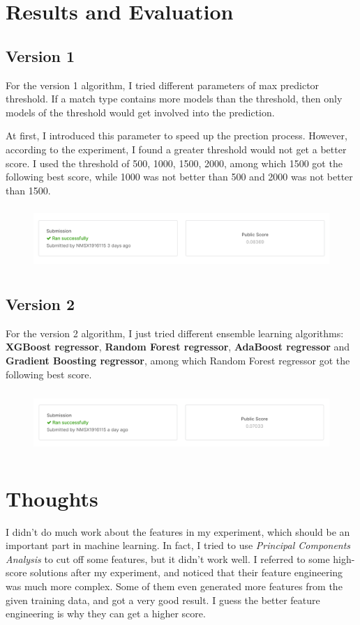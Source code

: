 \documentclass[journal=jacsat,manuscript=article]{achemso}
\begin{document}
\section{Results and Evaluation}

\subsection{Version 1}

For the version 1 algorithm, I tried different parameters of max predictor threshold.
If a match type contains more models than the threshold, then only models of the
threshold would get involved into the prediction.

At first, I introduced this parameter to speed up the prection process. However,
according to the experiment, I found a greater threshold would not get a better score.
I used the threshold of 500, 1000, 1500, 2000, among which 1500 got the following best score,
while 1000 was not better than 500 and 2000 was not better than 1500.

\begin{figure}
  \includegraphics[height=2.4cm]{img/res-version-1.png}
\end{figure}

\subsection{Version 2}

For the version 2 algorithm, I just tried different ensemble learning algorithms:
\textbf{XGBoost regressor}, \textbf{Random Forest regressor}, \textbf{AdaBoost regressor}
and \textbf{Gradient Boosting regressor}, among which Random Forest regressor 
got the following best score.

\begin{figure}
  \includegraphics[height=2.4cm]{img/res-version-2.png}
\end{figure}


\section{Thoughts}

I didn't do much work about the features in my experiment,
which should be an important part in machine learning.
In fact, I tried to use \emph{Principal Components Analysis} to cut off some features, 
but it didn't work well. I referred to some high-score solutions after my experiment,
and noticed that their feature engineering was much more complex.
Some of them even generated more features from the given training data,
and got a very good result.
I guess the better feature engineering is why they can get a higher score.
\end{document}
